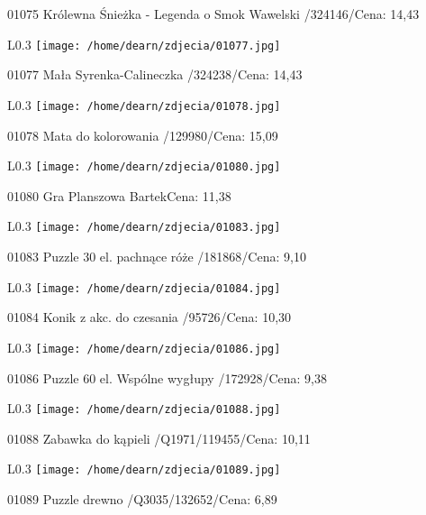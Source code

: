 01075 Królewna Śnieżka - Legenda o Smok Wawelski  /324146/Cena: 14,43\newline
\begin{wrapfigure}{L}{0.3\textwidth}
\texttt{[image: /home/dearn/zdjecia/01077.jpg]}
\end{wrapfigure}
01077 Mała Syrenka-Calineczka /324238/Cena: 14,43\newline
\begin{wrapfigure}{L}{0.3\textwidth}
\texttt{[image: /home/dearn/zdjecia/01078.jpg]}
\end{wrapfigure}
01078 Mata do kolorowania /129980/Cena: 15,09\newline
\begin{wrapfigure}{L}{0.3\textwidth}
\texttt{[image: /home/dearn/zdjecia/01080.jpg]}
\end{wrapfigure}
01080 Gra Planszowa BartekCena: 11,38\newline
\begin{wrapfigure}{L}{0.3\textwidth}
\texttt{[image: /home/dearn/zdjecia/01083.jpg]}
\end{wrapfigure}
01083 Puzzle 30 el. pachnące róże /181868/Cena: 9,10\newline
\begin{wrapfigure}{L}{0.3\textwidth}
\texttt{[image: /home/dearn/zdjecia/01084.jpg]}
\end{wrapfigure}
01084 Konik z akc. do czesania /95726/Cena: 10,30\newline
\begin{wrapfigure}{L}{0.3\textwidth}
\texttt{[image: /home/dearn/zdjecia/01086.jpg]}
\end{wrapfigure}
01086 Puzzle 60 el. Wspólne wygłupy /172928/Cena: 9,38\newline
\begin{wrapfigure}{L}{0.3\textwidth}
\texttt{[image: /home/dearn/zdjecia/01088.jpg]}
\end{wrapfigure}
01088 Zabawka do kąpieli /Q1971/119455/Cena: 10,11\newline
\begin{wrapfigure}{L}{0.3\textwidth}
\texttt{[image: /home/dearn/zdjecia/01089.jpg]}
\end{wrapfigure}
01089 Puzzle drewno /Q3035/132652/Cena: 6,89\newline
